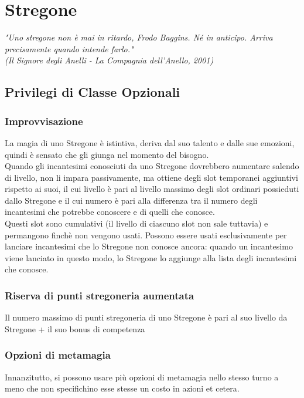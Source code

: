 \chapter{Stregone}

\begin{DndReadAloud}
    \it
    "Uno stregone non è mai in ritardo, Frodo Baggins. Né in anticipo. Arriva precisamente quando intende farlo." \\ (Il Signore degli Anelli - La Compagnia dell'Anello, 2001)
  \end{DndReadAloud}

\section{Privilegi di Classe Opzionali}

\subsection{Improvvisazione}

La magia di uno Stregone è istintiva, deriva dal suo talento e dalle sue emozioni, quindi è sensato che gli giunga nel momento del bisogno. \\ Quando gli incantesimi conosciuti da uno Stregone dovrebbero aumentare salendo di livello, non li impara passivamente, ma ottiene degli slot temporanei aggiuntivi rispetto ai suoi, il cui livello è pari al livello massimo degli slot ordinari possieduti dallo Stregone e il cui numero è pari alla differenza tra il numero degli incantesimi che potrebbe conoscere e di quelli che conosce. \\ Questi slot sono cumulativi (il livello di ciascuno slot non sale tuttavia) e permangono finchè non vengono usati. Possono essere usati esclusivamente per lanciare incantesimi che lo Stregone non conosce ancora: quando un incantesimo viene lanciato in questo modo, lo Stregone lo aggiunge alla lista degli incantesimi che conosce.

\subsection{Riserva di punti stregoneria aumentata}

Il numero massimo di punti stregoneria di uno Stregone è pari al suo livello da Stregone + il suo bonus di competenza

\subsection{Opzioni di metamagia}
Innanzitutto, si possono usare più opzioni di metamagia nello stesso turno a meno che non specifichino esse stesse un costo in azioni et cetera.

